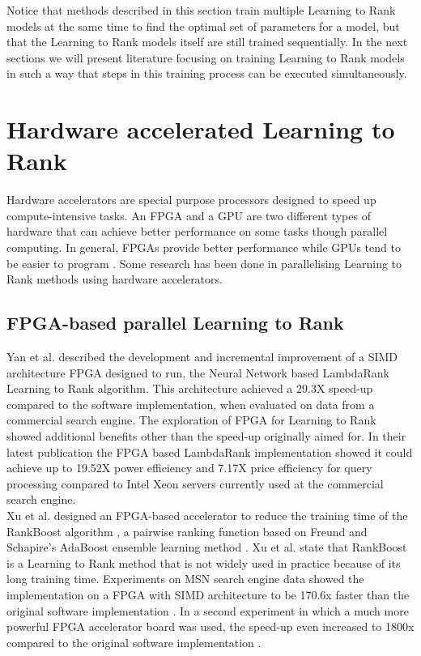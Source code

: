 Notice that methods described in this section train multiple Learning to Rank models at the same time to find the optimal set of parameters for a model, but that the Learning to Rank models itself are still trained sequentially. In the next sections we will present literature focusing on training Learning to Rank models in such a way that steps in this training process can be executed simultaneously.\\

\section{Hardware accelerated Learning to Rank}
Hardware accelerators are special purpose processors designed to speed up compute-intensive tasks. An \ac{FPGA} and a \ac{GPU} are two different types of hardware that can achieve better performance on some tasks though parallel computing. In general, \ac{FPGA}s provide better performance while \ac{GPU}s tend to be easier to program \cite{Che2008}. Some research has been done in parallelising Learning to Rank methods using hardware accelerators.

\subsection{FPGA-based parallel Learning to Rank}
Yan et al. \cite{Yan2009,Yan2010,Yan2011,Yan2012} described the development and incremental improvement of a \ac{SIMD} architecture \ac{FPGA} designed to run, the Neural Network based LambdaRank Learning to Rank algorithm. This architecture achieved a 29.3X speed-up compared to the software implementation, when evaluated on data from a commercial search engine. The exploration of \ac{FPGA} for Learning to Rank showed additional benefits other than the speed-up originally aimed for. In their latest publication \cite{Yan2012} the \ac{FPGA} based LambdaRank implementation showed it could achieve up to 19.52X power efficiency and 7.17X price efficiency for query processing compared to Intel Xeon servers currently used at the commercial search engine.\\

Xu et al. \cite{Xu2007b,Xu2009} designed an \ac{FPGA}-based accelerator to reduce the training time of the RankBoost algorithm \cite{Freund2003}, a pairwise ranking function based on Freund and Schapire's AdaBoost ensemble learning method \cite{Freund1997}. Xu et al. \cite{Xu2009} state that RankBoost is a Learning to Rank method that is not widely used in practice because of its long training time. Experiments on MSN search engine data showed the implementation on a \ac{FPGA} with \ac{SIMD} architecture to be 170.6x faster than the original software implementation \cite{Xu2007b}. In a second experiment in which a much more powerful \ac{FPGA} accelerator board was used, the speed-up even increased to 1800x compared to the original software implementation \cite{Xu2009}.\\

